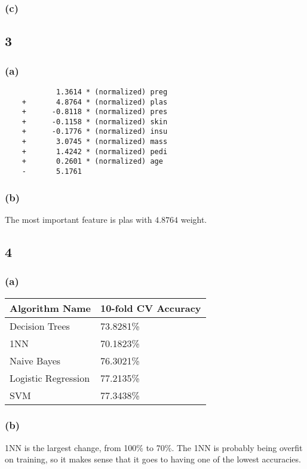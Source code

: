 \documentclass[12pt]{article}
\begin{document}
	\subsubsection*{(c)}
	
	
	\subsection*{3}
	\subsubsection*{(a)}
	\begin{verbatim}
	        1.3614 * (normalized) preg
	+       4.8764 * (normalized) plas
	+      -0.8118 * (normalized) pres
	+      -0.1158 * (normalized) skin
	+      -0.1776 * (normalized) insu
	+       3.0745 * (normalized) mass
	+       1.4242 * (normalized) pedi
	+       0.2601 * (normalized) age
	-       5.1761
	\end{verbatim}
	
	\subsubsection*{(b)}
	The most important feature is plas with $4.8764$ weight.
	
	\subsection*{4}
	\subsubsection*{(a)}
	
	\begin{tabular}{| l | l |}
		\hline
		Algorithm Name & 10-fold CV Accuracy \\
		\hline
		Decision Trees & 73.8281\% \\
		1NN & 70.1823\% \\
		Naive Bayes & 76.3021\% \\
		Logistic Regression & 77.2135\% \\
		SVM & 77.3438\% \\
		\hline
	\end{tabular}
	
	\subsubsection*{(b)}
	1NN is the largest change, from 100\% to 70\%. The 1NN is probably being overfit on training, so it makes sense that it goes to having one of the lowest accuracies.
	
\end{document}
